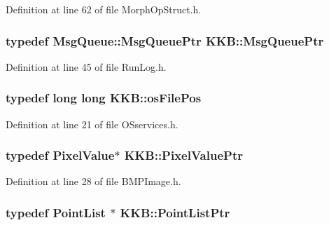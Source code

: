 Definition at line 62 of file Morph\+Op\+Struct.\+h.

\subsubsection[{\texorpdfstring{Msg\+Queue\+Ptr}{MsgQueuePtr}}]{\setlength{\rightskip}{0pt plus 5cm}typedef {\bf Msg\+Queue\+::\+Msg\+Queue\+Ptr} {\bf K\+K\+B\+::\+Msg\+Queue\+Ptr}}\hypertarget{namespace_k_k_b_aaa43074273f12ed325a053d9e1faf84a}{}\label{namespace_k_k_b_aaa43074273f12ed325a053d9e1faf84a}


Definition at line 45 of file Run\+Log.\+h.

\subsubsection[{\texorpdfstring{os\+File\+Pos}{osFilePos}}]{\setlength{\rightskip}{0pt plus 5cm}typedef long long {\bf K\+K\+B\+::os\+File\+Pos}}\hypertarget{namespace_k_k_b_a18d02cabaafac3bd64feb89b1fa02afa}{}\label{namespace_k_k_b_a18d02cabaafac3bd64feb89b1fa02afa}


Definition at line 21 of file O\+Sservices.\+h.

\subsubsection[{\texorpdfstring{Pixel\+Value\+Ptr}{PixelValuePtr}}]{\setlength{\rightskip}{0pt plus 5cm}typedef {\bf Pixel\+Value}$\ast$ {\bf K\+K\+B\+::\+Pixel\+Value\+Ptr}}\hypertarget{namespace_k_k_b_a7d98bc067fba7ce9b3ad4ecf4031cccf}{}\label{namespace_k_k_b_a7d98bc067fba7ce9b3ad4ecf4031cccf}


Definition at line 28 of file B\+M\+P\+Image.\+h.

\subsubsection[{\texorpdfstring{Point\+List\+Ptr}{PointListPtr}}]{\setlength{\rightskip}{0pt plus 5cm}typedef {\bf Point\+List} $\ast$ {\bf K\+K\+B\+::\+Point\+List\+Ptr}}\hypertarget{namespace_k_k_b_ad6b8056511ec9a218dd5ef30b57d1415}{}\label{namespace_k_k_b_ad6b8056511ec9a218dd5ef30b57d1415}


